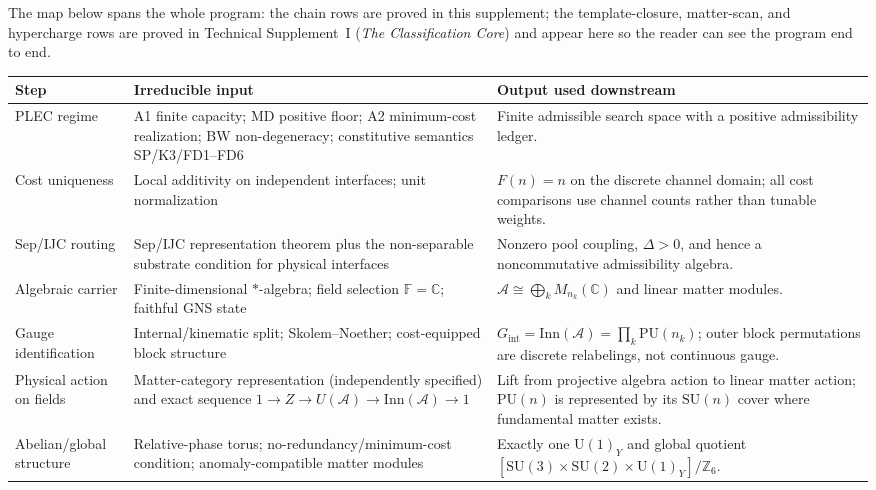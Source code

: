 \documentclass[11pt]{article}
\theoremstyle{definition}
\newcommand{\SU}{\mathrm{SU}}
\newcommand{\U}{\mathrm{U}}
\begin{document}
\begin{tcolorbox}[apfbox, title={Axioms-to-SM checklist: minimal load-bearing inputs of the whole program}]
\footnotesize
The map below spans the whole program: the chain rows are proved in this supplement; the template-closure, matter-scan, and hypercharge rows are proved in Technical Supplement~I (\emph{The Classification Core}) and appear here so the reader can see the program end to end.
\footnotesize
\begin{center}
\renewcommand{\arraystretch}{1.12}
\begin{tabular}{@{}p{2.3cm}p{5.2cm}p{5.0cm}@{}}
\toprule
\textbf{Step} & \textbf{Irreducible input} & \textbf{Output used downstream} \\
\midrule
PLEC regime & A1 finite capacity; MD positive floor; A2 minimum-cost realization; BW non-degeneracy; constitutive semantics SP/K3/FD1--FD6 & Finite admissible search space with a positive admissibility ledger. \\
Cost uniqueness & Local additivity on independent interfaces; unit normalization & $F(n)=n$ on the discrete channel domain; all cost comparisons use channel counts rather than tunable weights. \\
Sep/IJC routing & Sep/IJC representation theorem plus the non-separable substrate condition for physical interfaces & Nonzero pool coupling, $\Delta>0$, and hence a noncommutative admissibility algebra. \\
Algebraic carrier & Finite-dimensional $*$-algebra; field selection $\mathbb{F}=\mathbb{C}$; faithful GNS state & $\mathcal{A}\cong\bigoplus_k M_{n_k}(\mathbb{C})$ and linear matter modules. \\
Gauge identification & Internal/kinematic split; Skolem--Noether; cost-equipped block structure & $G_{\mathrm{int}}=\mathrm{Inn}(\mathcal{A})=\prod_k\mathrm{PU}(n_k)$; outer block permutations are discrete relabelings, not continuous gauge. \\
Physical action on fields & Matter-category representation (independently specified) and exact sequence $1\to Z\to U(\mathcal A)\to\mathrm{Inn}(\mathcal A)\to 1$ & Lift from projective algebra action to linear matter action; $\mathrm{PU}(n)$ is represented by its $\SU(n)$ cover where fundamental matter exists. \\
Abelian/global structure & Relative-phase torus; no-redundancy/minimum-cost condition; anomaly-compatible matter modules & Exactly one $\U(1)_Y$ and global quotient $[\SU(3)\times\SU(2)\times\U(1)_Y]/\mathbb Z_6$. \\

\end{tabular}
\end{center}
\end{tcolorbox}
\end{document}
